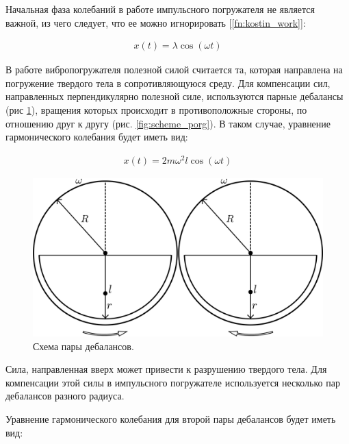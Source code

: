Начальная фаза колебаний в работе импульсного погружателя не является важной, из чего следует, что ее можно игнорировать [\ref{fn:kostin_work}]:


\begin{equation}\label{eq:harmonic_notphi}
    \begin{aligned}
        x(t) = \lambda \cos (\omega t)
    \end{aligned}
\end{equation}

В работе вибропогружателя полезной силой считается та, которая направлена на погружение твердого тела в сопротивляющуюся среду. Для компенсации сил, направленных перпендикулярно полезной силе, используются парные дебалансы (рис \ref{fig:double_debalance}), вращения которых происходит в противоположные стороны, по отношению друг к другу (рис. \ref{fig:scheme_porg}). В таком случае, уравнение гармонического колебания будет иметь вид:

\begin{equation}\label{eq:harmonic_dual}
    \begin{aligned}
        x(t) = 2 m \omega^2 l \cos (\omega t)
    \end{aligned}
\end{equation}


\begin{figure}[h]
    \centering
    \includegraphics[width=0.8\linewidth]{img/double_debalance.png}
    \caption{Схема пары дебалансов.}
    \label{fig:double_debalance}
\end{figure}

Сила, направленная вверх может привести к разрушению твердого тела. Для компенсации этой силы в импульсного погружателе используется несколько пар дебалансов разного радиуса.

Уравнение гармонического колебания для второй пары дебалансов будет иметь вид:

